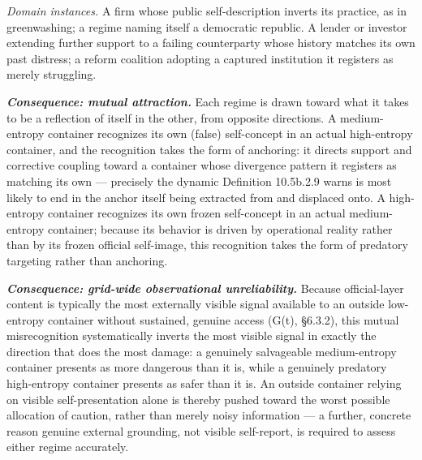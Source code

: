 \documentclass[
]{article}
\begin{document}
\emph{Domain instances.} A firm whose public self-description inverts
its practice, as in greenwashing; a regime naming itself a democratic
republic. A lender or investor extending further support to a failing
counterparty whose history matches its own past distress; a reform
coalition adopting a captured institution it registers as merely
struggling.

\emph{\textbf{Consequence: mutual attraction.}} Each regime is drawn
toward what it takes to be a reflection of itself in the other, from
opposite directions. A medium-entropy container recognizes its own
(false) self-concept in an actual high-entropy container, and the
recognition takes the form of anchoring: it directs support and
corrective coupling toward a container whose divergence pattern it
registers as matching its own --- precisely the dynamic Definition
10.5b.2.9 warns is most likely to end in the anchor itself being
extracted from and displaced onto. A high-entropy container recognizes
its own frozen self-concept in an actual medium-entropy container;
because its behavior is driven by operational reality rather than by its
frozen official self-image, this recognition takes the form of predatory
targeting rather than anchoring.

\emph{\textbf{Consequence: grid-wide observational unreliability.}}
Because official-layer content is typically the most externally visible
signal available to an outside low-entropy container without sustained,
genuine access (G(t), §6.3.2), this mutual misrecognition systematically
inverts the most visible signal in exactly the direction that does the
most damage: a genuinely salvageable medium-entropy container presents
as more dangerous than it is, while a genuinely predatory high-entropy
container presents as safer than it is. An outside container relying on
visible self-presentation alone is thereby pushed toward the worst
possible allocation of caution, rather than merely noisy information ---
a further, concrete reason genuine external grounding, not visible
self-report, is required to assess either regime accurately.
\end{document}
